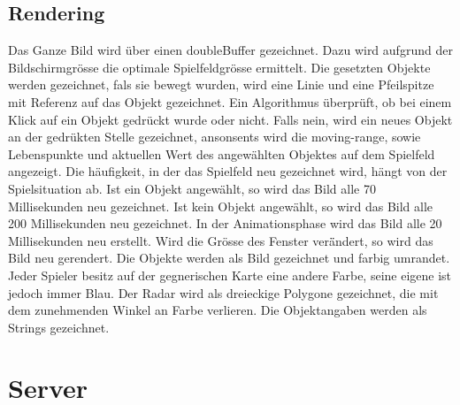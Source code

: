 \documentclass[ngerman, 12pt, pdftex]{scrartcl}[2006/07/30]
\begin{document}
\subsection{Rendering}

Das Ganze Bild wird über einen doubleBuffer gezeichnet.
Dazu wird aufgrund der Bildschirmgr\"{o}sse die optimale Spielfeldgr\"{o}sse ermittelt.
Die gesetzten Objekte werden gezeichnet, fals sie bewegt wurden, wird eine Linie und eine Pfeilspitze mit Referenz auf das Objekt gezeichnet.
Ein Algorithmus \"{u}berpr\"{u}ft, ob bei einem Klick auf ein Objekt gedr\"{u}ckt wurde oder nicht. Falls nein, wird ein neues Objekt an der gedr\"{u}kten Stelle gezeichnet, ansonsents wird die moving-range, sowie Lebenspunkte und aktuellen Wert des angew\"{a}hlten Objektes auf dem Spielfeld angezeigt.
Die h\"{a}ufigkeit, in der das Spielfeld neu gezeichnet wird, h\"{a}ngt von der Spielsituation ab. Ist ein Objekt angew\"{a}hlt, so wird das Bild alle 70 Millisekunden neu gezeichnet. Ist kein Objekt angew\"{a}hlt, so wird das Bild alle 200 Millisekunden neu gezeichnet. In der Animationsphase wird das Bild alle 20 Millisekunden neu erstellt.
Wird die Gr\"{o}sse des Fenster ver\"{ä}ndert, so wird das Bild neu gerendert.
Die Objekte werden als Bild gezeichnet und farbig umrandet. Jeder Spieler besitz auf der gegnerischen Karte eine andere Farbe, seine eigene ist jedoch immer Blau.
Der Radar wird als dreieckige Polygone gezeichnet, die mit dem zunehmenden Winkel an Farbe verlieren. Die Objektangaben werden als Strings gezeichnet.


\section{Server}
\end{document}
